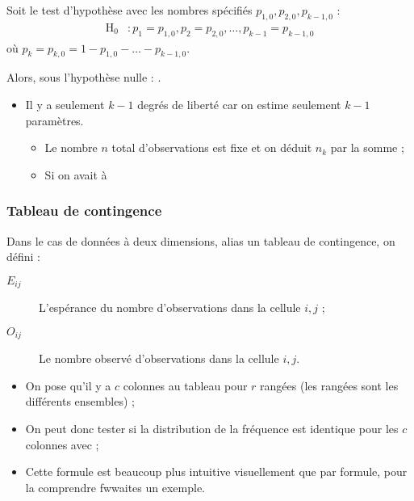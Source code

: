 \documentclass[10pt, french]{article}
\begin{document}
\begin{multicols*}{2}
Soit le test d'hypothèse avec les nombres spécifiés $p_{1,0}, p_{2,0}, p_{k - 1,0}$ :
\begin{align*}
	\mathrm{H}_{0}	&:	
	p_{1}	=	p_{1,0}, p_{2}	=	p_{2,0},	 \dots, p_{k - 1}	=	p_{k - 1,0}
\end{align*}
où $p_{k}	=	p_{k,0}	=	1	-	p_{1,0}	-	\hdots	-	p_{k - 1,0}$.

Alors, sous l'hypothèse nulle : .
\begin{itemize}
	\item	Il y a seulement $k - 1$ degrés de liberté car on estime seulement $k - 1$ paramètres.
		\begin{itemize}
		\item	Le nombre $n$ total d'observations est fixe et on déduit $n_{k}$ par la somme ;
		\item	Si on avait à 
		\end{itemize}
\end{itemize}

\subsubsection*{Tableau de contingence}
Dans le cas de données à deux dimensions, alias un tableau de contingence, on défini :
\begin{description}
	\item[$E_{ij}$]	L'espérance du nombre d'observations dans la cellule $i, j$ ;
	\item[$O_{ij}$]	Le nombre observé d'observations dans la cellule $i, j$.
\end{description}

\begin{itemize}
	\item	On pose qu'il y a $c$ colonnes au tableau pour $r$ rangées (les rangées sont les différents ensembles) ;
	\item	On peut donc tester si la distribution de la fréquence est identique pour les $c$ colonnes avec  ;
	\item	Cette formule est beaucoup plus intuitive visuellement que par formule, pour la comprendre fwwaites un exemple.
\end{itemize}



\end{multicols*}
\end{document}
